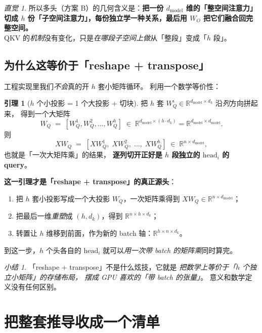 \documentclass[11pt,a4paper]{ctexart}
\theoremstyle{definition}
\newtheorem{lemma}{引理}
\theoremstyle{remark}
\newtheorem*{intuitionx}{直觉}
\newtheorem*{summary}{小结}
\newcommand{\R}{\mathbb{R}}
\begin{document}
\begin{intuitionx}
所以多头（方案 B）的几何含义是：\textbf{把一份 $d_{\text{model}}$ 维的「整空间注意力」
切成 $h$ 份「子空间注意力」，每份独立学一种关系，最后用 $W_O$ 把它们融合回完整空间。}\\
QKV 的\emph{机制}没有变化，只是\emph{在哪段子空间上做}从「整段」变成「$h$ 段」。
\end{intuitionx}

\subsection{为什么这等价于「reshape + transpose」}

工程实现里我们\emph{不会}真的开 $h$ 套小矩阵循环。
利用一个数学等价性：

\begin{lemma}[$h$ 个小投影 = 1 个大投影 + 切块]
把 $h$ 套 $W_Q^i \in \R^{d_{\text{model}} \times d_k}$ 沿\emph{列}方向拼起来，
得到一个大矩阵
\[
  W_Q \;=\; [W_Q^1, W_Q^2, \dots, W_Q^h] \;\in\; \R^{d_{\text{model}} \times (h\cdot d_k)} = \R^{d_{\text{model}} \times d_{\text{model}}}.
\]
则
\[
  X W_Q \;=\; [X W_Q^1,\; X W_Q^2,\; \dots,\; X W_Q^h]
  \;\in\; \R^{n \times d_{\text{model}}},
\]
也就是「一次大矩阵乘」的结果，
\textbf{逐列切开正好是 $h$ 段独立的 $\mathrm{head}_i$ 的 query}。
\end{lemma}

\textbf{这一引理才是「reshape + transpose」的真正源头}：
\begin{enumerate}
  \item 把 $h$ 套小投影写成一个大投影 $W_Q$，一次矩阵乘得到 $X W_Q \in \R^{n \times d_{\text{model}}}$；
  \item 把最后一维\emph{重塑}成 $(h, d_k)$，得到 $\R^{n \times h \times d_k}$；
  \item 转置让 $h$ 维移到前面，作为新的 batch 轴：$\R^{h \times n \times d_k}$。
\end{enumerate}

到这一步，$h$ 个头各自的 $\mathrm{head}_i$ 就可以\emph{用一次带 batch 的矩阵乘}同时算完。

\begin{summary}
「reshape + transpose」不是什么炫技，它就是
\emph{把数学上等价于「$h$ 个独立小矩阵」的存储布局，
摆成 GPU 喜欢的「带 batch 的张量」}。
意义和数学定义没有任何区别。
\end{summary}

\section{把整套推导收成一个清单}
\end{document}
